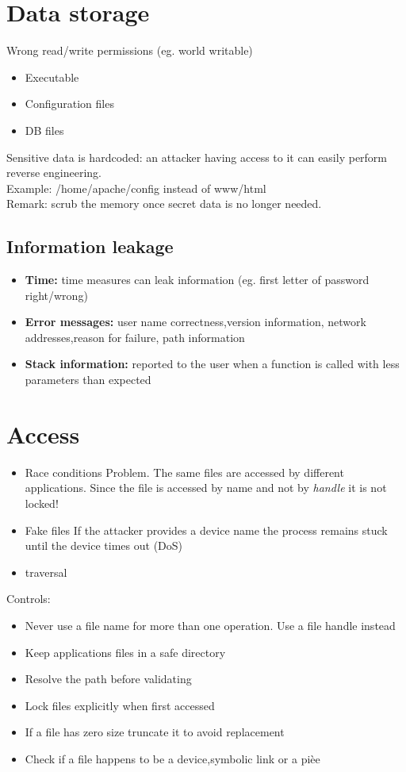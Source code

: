 \documentclass[10pt,a4paper]{article}
\begin{document}
\section{Data storage}
Wrong read/write permissions (eg. world writable)
\begin{itemize}
\item Executable
\item Configuration files
\item DB files
\end{itemize}
Sensitive data is hardcoded: an attacker having access to it can easily perform reverse engineering.\\
Example: /home/apache/config instead of www/html\\
Remark: scrub the memory once secret data is no longer needed.
\subsection{Information leakage}
\begin{itemize}
\item \textbf{Time:} time measures can leak information (eg. first letter of password right/wrong)
\item \textbf{Error messages:} user name correctness,version information, network addresses,reason for failure, path information
\item \textbf{Stack information:} reported to the user when a function is called with less parameters than expected
\end{itemize}
\section{Access}
\begin{itemize}
\item Race conditions
Problem. The same files are accessed by different applications. Since the file is accessed by name and not by \emph{handle} it is not locked!
\item Fake files
If the attacker provides a device name the process remains stuck until the device times out (DoS)
\item traversal
\end{itemize}
Controls:
\begin{itemize}
\item Never use a file name for more than one operation. Use a file handle instead
\item Keep applications files in a safe directory
\item Resolve the path before validating
\item Lock files explicitly when first accessed
\item If a file has zero size truncate it to avoid replacement
\item Check if a file happens to be a device,symbolic link or a pièe
\end{itemize}
\end{document}
